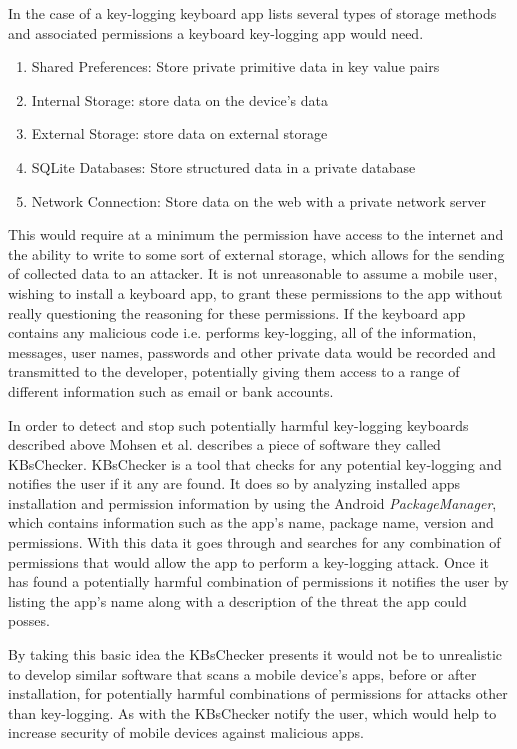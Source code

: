 \documentclass{sig-alternate}
\begin{document}
	  In the case of a key-logging keyboard app \cite{Keylogging} lists several types of storage methods and associated permissions a keyboard key-logging app would need.
	\begin{enumerate}
	\item Shared Preferences: Store private primitive data in key value pairs
	\item Internal Storage: store data on the device's data
	\item External Storage: store data on external storage
	\item SQLite Databases: Store structured data in a private database
	\item Network Connection: Store data on the web with a private network server
	\end{enumerate} 
	 
This would require at a minimum the permission have access to the internet and the ability to write to some sort of external storage, which allows for the sending of collected data to an attacker. It is not unreasonable to assume a mobile user, wishing to install a keyboard app, to grant these permissions to the app without really questioning the reasoning for these permissions. If the keyboard app contains any malicious code i.e. performs key-logging, all of the information, messages, user names, passwords and other private data would be recorded and transmitted to the developer, potentially giving them access to a range of different information such as email or bank accounts.

In order to detect and stop such potentially harmful key-logging keyboards described above Mohsen et al. \cite{Keylogging} describes a piece of software they called KBsChecker. KBsChecker is a tool that checks for any potential key-logging and notifies the user if it any are found. It does so by analyzing installed apps installation and permission information by using the Android \textit{PackageManager}, which contains information such as the app's name, package name, version and permissions. With this data it goes through and searches for any combination of permissions that would allow the app to perform a key-logging attack. Once it has found a potentially harmful combination of permissions it notifies the user by listing the app's name along with a description of the threat the app could posses.

 By taking this basic idea the KBsChecker presents it would not be to unrealistic to develop similar software that scans a mobile device's apps, before or after installation, for potentially harmful combinations of permissions for attacks other than key-logging. As with the KBsChecker notify the user, which would help to increase security of mobile devices against malicious apps.    
\end{document}
